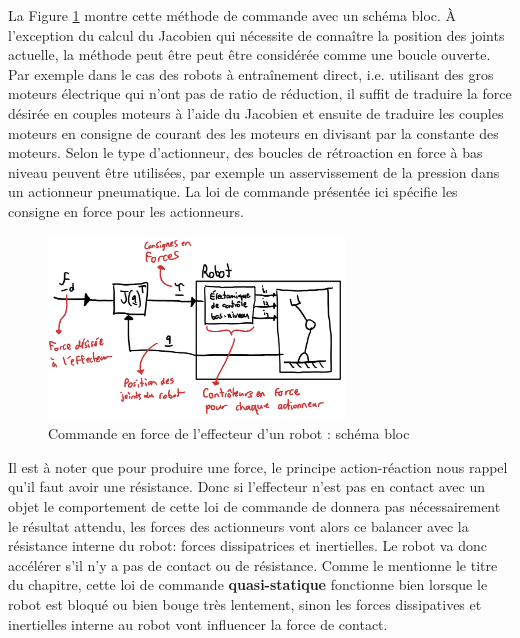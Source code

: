 La Figure \ref{fig:forcecontroleffectorbloc} montre cette méthode de commande avec un schéma bloc. À l'exception du calcul du Jacobien qui nécessite de connaître la position des joints actuelle, la méthode peut être peut être considérée comme une boucle ouverte.  Par exemple dans le cas des robots à entraînement direct, i.e. utilisant des gros moteurs électrique qui n'ont pas de ratio de réduction, il suffit de traduire la force désirée en couples moteurs à l'aide du Jacobien et ensuite de traduire les couples moteurs en consigne de courant des les moteurs en divisant par la constante des moteurs. Selon le type d'actionneur, des boucles de rétroaction en force à bas niveau peuvent être utilisées, par exemple un asservissement de la pression dans un actionneur pneumatique. La loi de commande présentée ici spécifie les consigne en force pour les actionneurs.
\begin{figure}[H]
	\centering
		\includegraphics[width=0.70\textwidth]{fig/forcecontroleffectorbloc.jpg}
	\caption{Commande en force de l'effecteur d'un robot : schéma bloc}
	\label{fig:forcecontroleffectorbloc}
\end{figure}

Il est à noter que pour produire une force, le principe action-réaction nous rappel qu'il faut avoir une résistance. Donc si l'effecteur n'est pas en contact avec un objet le comportement de cette loi de commande de donnera pas nécessairement le résultat attendu, les forces des actionneurs vont alors ce balancer avec la résistance interne du robot: forces dissipatrices et inertielles. Le robot va donc accélérer s'il n'y a pas de contact ou de résistance. Comme le mentionne le titre du chapitre, cette loi de commande \textbf{quasi-statique} fonctionne bien lorsque le robot est bloqué ou bien bouge très lentement, sinon les forces dissipatives et inertielles interne au robot vont influencer la force de contact. 



